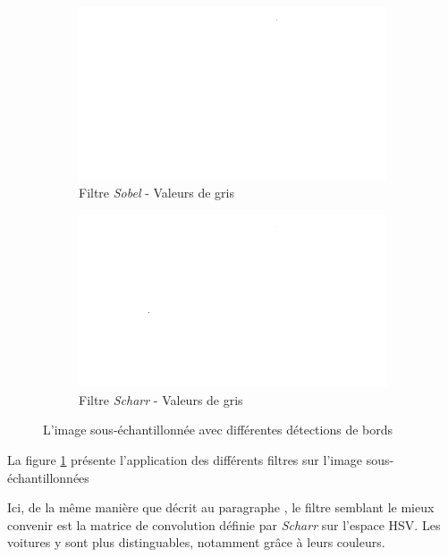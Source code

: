 \begin{figure}[H]
    \bigskip
    \begin{subfigure}{.5\textwidth}
        \centering
        \includegraphics[width=.85\linewidth]{img/conception/image_process/downsample-edge/2.png}
        \caption{Filtre \textit{Sobel} - Valeurs de gris}
    \end{subfigure}%
    \begin{subfigure}{.5\textwidth}
        \centering
        \includegraphics[width=.85\linewidth]{img/conception/image_process/downsample-edge/5.png}
        \caption{Filtre \textit{Scharr} - Valeurs de gris}
    \end{subfigure}%
    \centering
    \caption{L'image sous-échantillonnée avec différentes détections de bords}
    \label{fig:image_process_down_edge}
\end{figure}

La figure \ref{fig:image_process_down_edge} présente l'application des différents filtres sur l'image sous-échantillonnées

Ici, de la même manière que décrit au paragraphe , le filtre semblant le mieux convenir est la matrice de convolution définie par \textit{Scharr} sur l'espace HSV. Les voitures y sont plus distinguables, notamment grâce à leurs couleurs.

